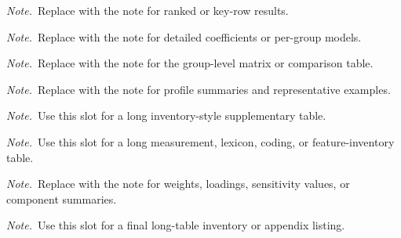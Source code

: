 \documentclass[12pt,a4paper]{article}
\newcommand{\tabnote}[1]{%
  \par\vspace{3pt}\noindent%
  \begin{minipage}{0.96\linewidth}\footnotesize\raggedright\textit{Note.}~#1\end{minipage}%
}
\begin{document}
\begin{table}[htb]
  \raggedright
  \small
  \caption{[Supplementary Table S2 Placeholder]}
  \label{tab:s2}
  \resizebox{\textwidth}{!}{}
  \tabnote{Replace with the note for ranked or key-row results.}
\end{table}

\begin{table}[htb]
  \raggedright
  \small
  \caption{[Supplementary Table S3 Placeholder]}
  \label{tab:s3}
  \resizebox{\textwidth}{!}{}
  \tabnote{Replace with the note for detailed coefficients or per-group models.}
\end{table}

\begin{table}[htb]
  \raggedright
  \small
  \caption{[Supplementary Table S4 Placeholder]}
  \label{tab:s4}
  \resizebox{\textwidth}{!}{}
  \tabnote{Replace with the note for the group-level matrix or comparison table.}
\end{table}

\begin{table}[htb]
  \raggedright
  \small
  \caption{[Supplementary Table S5 Placeholder]}
  \label{tab:s5}
  \resizebox{\textwidth}{!}{}
  \tabnote{Replace with the note for profile summaries and representative examples.}
\end{table}

\clearpage
\begingroup
\small
\raggedright

\endgroup
\tabnote{Use this slot for a long inventory-style supplementary table.}

\clearpage
\begingroup
\footnotesize
\raggedright

\endgroup
\tabnote{Use this slot for a long measurement, lexicon, coding, or feature-inventory table.}

\clearpage
\begin{table}[H]
  \raggedright
  \small
  \caption{[Supplementary Table S8 Placeholder]}
  \label{tab:s8}
  \resizebox{\textwidth}{!}{}
  \tabnote{Replace with the note for weights, loadings, sensitivity values, or component summaries.}
\end{table}

\begingroup
\small
\raggedright

\endgroup
\tabnote{Use this slot for a final long-table inventory or appendix listing.}
\end{document}
